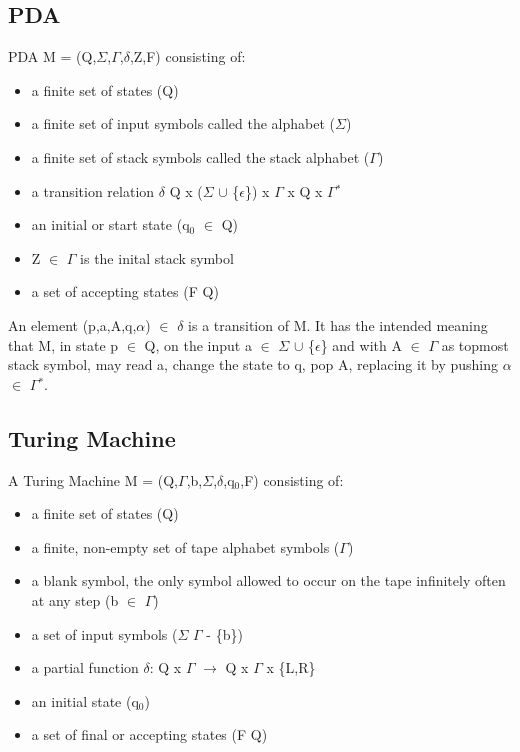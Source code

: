 \documentclass[11pt]{article}
\begin{document}
\subsection{PDA}
\label{sec-1-7}
PDA M = (Q,$\Sigma$,$\Gamma$,$\delta$,Z,F) consisting of:
\begin{itemize}
\item a finite set of states (Q)
\item a finite set of input symbols called the alphabet ($\Sigma$)
\item a finite set of stack symbols called the stack alphabet ($\Gamma$)
\item a transition relation $\delta$ \subseteq Q x ($\Sigma$ $\cup$ \{$\epsilon$\}) x $\Gamma$ x Q x $\Gamma$$^{\text{*}}$
\item an initial or start state (q$_{\text{0}}$ $\in$ Q)
\item Z $\in$ $\Gamma$ is the inital stack symbol
\item a set of accepting states (F \subseteq Q)
\end{itemize}

An element (p,a,A,q,$\alpha$) $\in$ $\delta$ is a transition of M. It has the intended meaning that M, in state p $\in$ Q, on the input 
a $\in$ $\Sigma$ $\cup$ \{$\epsilon$\} and with A $\in$ $\Gamma$ as topmost stack symbol, may read a, change the state to q, pop A, replacing it
by pushing $\alpha$ $\in$ $\Gamma$$^{\text{*}}$. 

\subsection{Turing Machine}
\label{sec-1-8}
A Turing Machine M = (Q,$\Gamma$,b,$\Sigma$,$\delta$,q$_{\text{0}}$,F) consisting of:
\begin{itemize}
\item a finite set of states (Q)
\item a finite, non-empty set of tape alphabet symbols ($\Gamma$)
\item a blank symbol, the only symbol allowed to occur on the tape infinitely often at any step (b $\in$ $\Gamma$)
\item a set of input symbols ($\Sigma$ \subseteq $\Gamma$ - \{b\})
\item a partial function $\delta$: Q x $\Gamma$ $\rightarrow$ Q x $\Gamma$ x \{L,R\}
\item an initial state (q$_{\text{0}}$)
\item a set of final or accepting states (F \subseteq Q)
\end{itemize}
\end{document}
